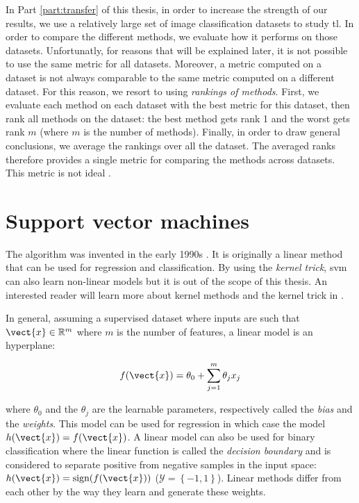 In Part \ref{part:transfer} of this thesis, in order to increase the strength of our results, we use a relatively large set of image classification datasets to study \acrlong{tl}. In order to compare the different methods, we evaluate how it performs on those datasets. Unfortunatly, for reasons that will be explained later, it is not possible to use the same metric for all datasets. Moreover, a metric computed on a dataset is not always comparable to the same metric computed on a different dataset. For this reason, we resort to using \textit{rankings of methods}. First, we evaluate each method on each dataset with the best metric for this dataset, then rank all methods on the dataset: the best method gets rank 1 and the worst gets rank $m$ (where $m$ is the number of methods). Finally, in order to draw general conclusions, we average the rankings over all the dataset. The averaged ranks therefore provides a single metric for comparing the methods across datasets. This metric is not ideal .


\section{Support vector machines}

The  algorithm was invented in the early 1990s \parencite{boser1992training}. It is originally a linear method that can be used for regression and classification. By using the \textit{kernel trick}, \acrshort{svm} can also learn non-linear models but it is out of the scope of this thesis. An interested reader will learn more about kernel methods and the kernel trick in \parencite{friedman2017elements}.

In general, assuming a supervised dataset where inputs are such that $\vect{x} \in \mathbb{R}^m$ where $m$ is the number of features, a linear model is an hyperplane:

\begin{equation}
\label{eqn:backml:linearmodel}
f(\vect{x}) = \theta_0 + \sum_{j=1}^m \theta_j x_j  
\end{equation}

where $\theta_0$ and the $\theta_j$ are the learnable parameters, respectively called the \textit{bias} and the \textit{weights}. This model can be used for regression in which case the model $h(\vect{x}) = f(\vect{x})$. A linear model can also be used for binary classification where the linear function is called the \textit{decision boundary} and is considered to separate positive from negative samples in the input space: $h(\vect{x}) = \text{sign}(f(\vect{x}))$ (\ie $\mathcal{Y} = \left\{-1, 1\right\}$). Linear methods differ from each other by the way they learn and generate these weights.

